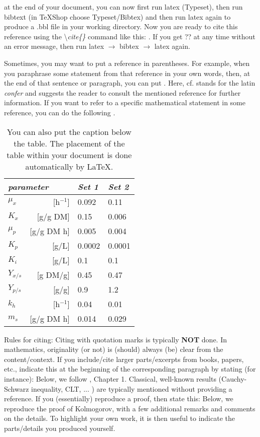 \documentclass[aodsor,preprint]{imsart}
\numberwithin{equation}{section}
\theoremstyle{plain}
\begin{document}
at the end of your document, you can now first run latex (Typeset), then run bibtext (in TeXShop choose Typeset/Bibtex) and then run latex again to produce a .bbl file in your working directory. Now you are ready to cite this reference using the \textbackslash\emph{cite\{\}} command like this: \cite{Billingsley08}. If you get ?? at any time without an error message, then run latex $\rightarrow$ bibtex $\rightarrow$ latex again.

Sometimes, you may want to put a reference in parentheses. For example, when you paraphrase some statement from that reference in your own words, then, at the end of that sentence or paragraph, you can put \citep[cf.][]{Abadie14}. Here, cf. stands for the latin \emph{confer} and suggests the reader to consult the mentioned reference for further information.
If you want to refer to a specific mathematical statement in some reference, you can do the following
\citep[see][Theorem~2]{Anderson76}.

\begin{table}
\centering
\begin{tabular}{lrll}
\hline
\multicolumn{2}{l}{\it parameter} & {\it Set 1} & {\it Set 2}\\
\hline
$\mu_{x}$           & [h$^{-1}$]  & 0.092       & 0.11          \\
$K_{x}$             & [g/g DM]     & 0.15        & 0.006         \\
$\mu_{p}$           & [g/g DM h]  & 0.005       & 0.004         \\
$K_{p}$             & [g/L]        & 0.0002      & 0.0001        \\
$K_{i}$             & [g/L]        & 0.1         & 0.1           \\
$Y_{x/s}$           & [g DM/g]     & 0.45        & 0.47          \\
$Y_{p/s}$           & [g/g]        & 0.9         & 1.2           \\
$k_{h}$             & [h$^{-1}$]  & 0.04        & 0.01          \\
$m_{s}$             & [g/g DM h]  & 0.014       & 0.029         \\
\hline
\end{tabular}
\caption{You can also put the caption below the table. The placement of the table within your document is done automatically by \LaTeX.}\label{parset}
\end{table}

Rules for citing: Citing with quotation marks is typically {\bf NOT} done. In mathematics, originality (or not) is (should) always (be) clear from the content/context.
If you include/cite larger parts/excerpts from books, papers, etc., indicate this at the beginning of the corresponding paragraph by stating (for instance):
Below, we follow \cite{Billingsley08}, Chapter 1. Classical, well-known results (Cauchy-Schwarz inequality, CLT, ... ) are typically mentioned without providing
a reference. If you (essentially) reproduce a proof, then state this: Below, we reproduce the proof of Kolmogorov, with a few additional remarks and comments on the details. To highlight your own work, it is then useful to indicate the parts/details you produced yourself.
\end{document}
